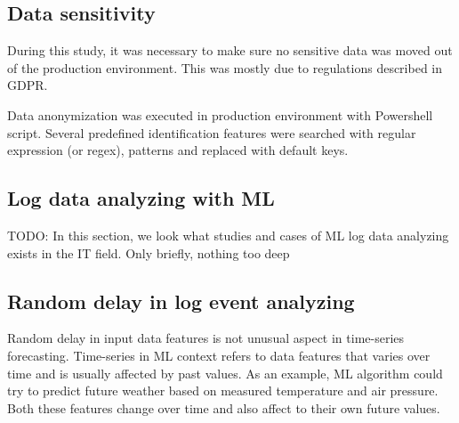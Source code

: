 

\subsection{Data sensitivity}\label{subsec:bg-data-sensitivity}

During this study,
it was necessary to make sure no sensitive data
was moved out of the production environment.
This was mostly due to regulations described in GDPR. %

Data anonymization was executed in production environment
with Powershell script.
Several predefined identification features were searched with
regular expression (or regex), patterns and replaced with
default keys.


\subsection{Log data analyzing with ML}\label{subsec:bg-log-data-analyzing-with-ml}
TODO: In this section, we look what studies and cases of ML log data analyzing
exists in the IT field.
Only briefly, nothing too deep



\subsection{Random delay in log event analyzing}\label{subsec:bg-random-delay}

Random delay in input data features
is not unusual aspect in time-series forecasting.
Time-series in ML context
refers to data features that varies over time
and is usually affected by past values.
As an example,
ML algorithm could try to predict future weather
based on measured temperature and air pressure.
Both these features change over time
and also affect to their own future values.

